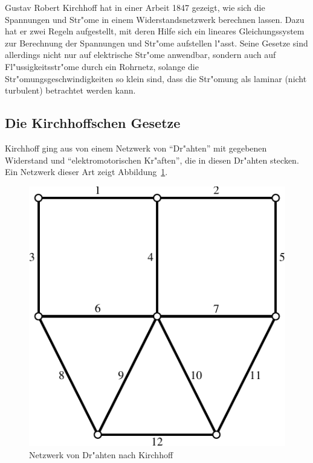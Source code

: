 %
%
Gustav Robert Kirchhoff hat in einer Arbeit 1847 gezeigt, wie sich
die Spannungen und Str"ome in einem Widerstandsnetzwerk berechnen
lassen. Dazu hat er zwei Regeln aufgestellt, mit deren Hilfe
sich ein lineares Gleichungssystem zur Berechnung der Spannungen
und Str"ome aufstellen l"asst.
Seine Gesetze sind allerdings
nicht nur auf elektrische Str"ome anwendbar, sondern auch auf
Fl"ussigkeitsstr"ome durch ein Rohrnetz, solange die
Str"omungsgeschwindigkeiten so klein sind, dass die Str"omung als
laminar (nicht turbulent) betrachtet werden kann.

\subsection{Die Kirchhoffschen Gesetze\label{appkirchhoff}}
Kirchhoff ging aus von einem Netzwerk von ``Dr"ahten'' mit gegebenen
Widerstand und ``elektromotorischen Kr"aften'', die in diesen
Dr"ahten stecken. Ein Netzwerk dieser Art zeigt
Abbildung~\ref{kirchhoff-netzwerk}.
\begin{figure}
\begin{center}
\includegraphics[width=0.6\hsize]{images/kirchhoff-1}
\end{center}
\caption{Netzwerk von Dr"ahten nach Kirchhoff\label{kirchhoff-netzwerk}}
\end{figure}

